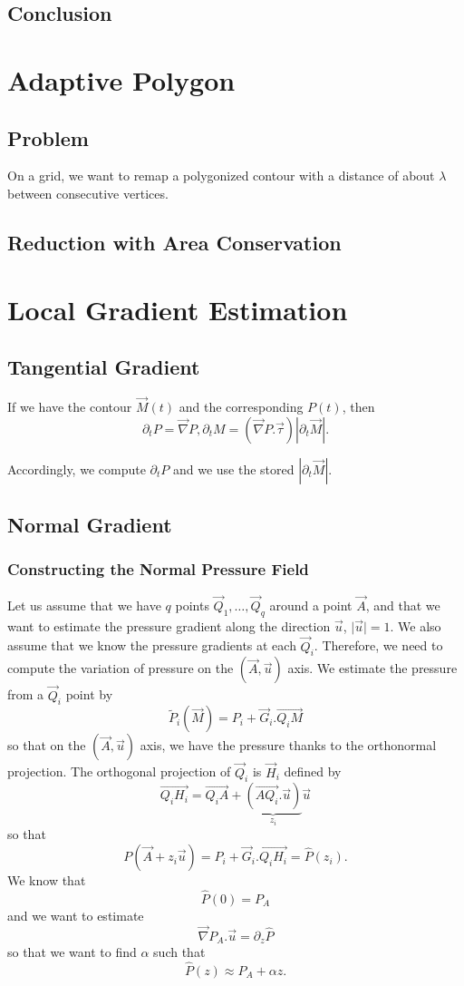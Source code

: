 \documentclass[aps]{revtex4}
\newcommand{\myvec}[1]{\overrightarrow{#1}}
\newcommand{\mygrad}{\vec{\nabla}}
\begin{document}
\subsection{Conclusion}

\section{Adaptive Polygon}

\subsection{Problem}
On a grid, we want to remap a polygonized contour with a distance of about $\lambda$ between consecutive vertices.

\subsection{Reduction with Area Conservation}


\section{Local Gradient Estimation}

\subsection{Tangential Gradient}
If we have the contour $\vec{M}(t)$ and the corresponding $P(t)$, then
$$
	\partial_t P = \mygrad P , \partial_t M = \left(\mygrad P . \vec{\tau}\right) \left|\partial_t \vec{M}\right|.
$$

Accordingly, we compute $\partial_t P$ and we use the stored $\left|\partial_t \vec{M}\right|$.

\subsection{Normal Gradient}
\subsubsection{Constructing the Normal Pressure Field}

Let us assume that we have $q$ points $\vec{Q}_1,\ldots,\vec{Q}_{q}$ around a point $\vec{A}$, and that we want to
estimate the pressure gradient along the direction $\vec{u}$, $\vert\vec{u}\vert=1$. 
We also assume that we know the pressure gradients at each $\vec{Q}_i$.
Therefore, we need to compute the variation of pressure on the $(\vec{A},\vec{u})$ axis.
We estimate the pressure from a $\vec{Q}_i$ point by
$$
	\tilde{P}_i(\vec{M}) = P_i + \vec{G}_i.\myvec{Q_iM}
$$
so that on the  $(\vec{A},\vec{u})$ axis, we have the pressure thanks to the orthonormal projection.
The orthogonal projection of $\vec{Q}_i$ is $\vec{H}_i$ defined by
$$
	\myvec{Q_iH_i} = \myvec{Q_iA} + \underbrace{\left(\myvec{AQ_i}.\vec{u}\right)}_{z_i}\vec{u}
$$
so that
$$
	P(\vec{A}+z_i \vec{u}) = P_i + \vec{G}_i.\myvec{Q_iH_i} 	= \hat{P}(z_i).
$$
We know that
$$
	\hat{P}(0) = P_A
$$
and we want to estimate
$$
	\mygrad P_A . \vec{u} = \partial_z \hat{P}
$$
so that we want to find $\alpha$ such that
$$
	\hat{P}(z) \approx P_A + \alpha z.
$$
\end{document}
